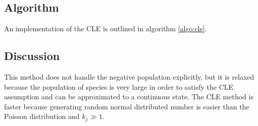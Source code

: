   \subsection{Algorithm}
  An implementation of the CLE is outlined in algorithm \ref{algo:cle}.

  

  \subsection{Discussion}
  This method does not handle the negative population explicitly, but it is relaxed because the population of species is very large in order to satisfy the CLE assumption and can be approximated to a continuous state.
  The CLE method is faster because generating random normal distributed number is easier than the Poisson distribution and $k_j\gg 1$.
